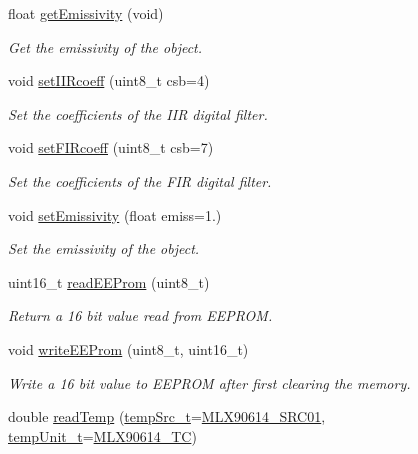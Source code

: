 \begin{DoxyCompactItemize}
float \mbox{\hyperlink{class_m_l_x90614_a44234371f1e9dd36781898d0c87fdbbf}{get\+Emissivity}} (void)
\begin{DoxyCompactList}\small\item\em Get the emissivity of the object. \end{DoxyCompactList}\item 
void \mbox{\hyperlink{class_m_l_x90614_af62b9d897164375e8c17fb5a8d367600}{set\+I\+I\+Rcoeff}} (uint8\+\_\+t csb=4)
\begin{DoxyCompactList}\small\item\em Set the coefficients of the I\+IR digital filter. \end{DoxyCompactList}\item 
void \mbox{\hyperlink{class_m_l_x90614_a3849320b7988ca5882f25fbc87dd0de7}{set\+F\+I\+Rcoeff}} (uint8\+\_\+t csb=7)
\begin{DoxyCompactList}\small\item\em Set the coefficients of the F\+IR digital filter. \end{DoxyCompactList}\item 
void \mbox{\hyperlink{class_m_l_x90614_ab7e462d10f8d26bdd55f77eb4c81a5ff}{set\+Emissivity}} (float emiss=1.)
\begin{DoxyCompactList}\small\item\em Set the emissivity of the object. \end{DoxyCompactList}\item 
uint16\+\_\+t \mbox{\hyperlink{class_m_l_x90614_aab0a010875527f4ac3d2794017624b10}{read\+E\+E\+Prom}} (uint8\+\_\+t)
\begin{DoxyCompactList}\small\item\em Return a 16 bit value read from E\+E\+P\+R\+OM. \end{DoxyCompactList}\item 
void \mbox{\hyperlink{class_m_l_x90614_a70b3e428c623b6af5bedf199f5c16490}{write\+E\+E\+Prom}} (uint8\+\_\+t, uint16\+\_\+t)
\begin{DoxyCompactList}\small\item\em Write a 16 bit value to E\+E\+P\+R\+OM after first clearing the memory. \end{DoxyCompactList}\item 
double \mbox{\hyperlink{class_m_l_x90614_ab2a8bafff744a249325105d238bfe248}{read\+Temp}} (\mbox{\hyperlink{class_m_l_x90614_a500f8c49b00e725d5c201092d9c02b8b}{temp\+Src\+\_\+t}}=\mbox{\hyperlink{class_m_l_x90614_a500f8c49b00e725d5c201092d9c02b8ba91f620721ea47dec379db791d735a55b}{M\+L\+X90614\+\_\+\+S\+R\+C01}}, \mbox{\hyperlink{class_m_l_x90614_a18769519e647d93c959566b81d2e514f}{temp\+Unit\+\_\+t}}=\mbox{\hyperlink{class_m_l_x90614_a18769519e647d93c959566b81d2e514fa75d66a29cab65ff4514b5cd6a268c7bf}{M\+L\+X90614\+\_\+\+TC}})

\end{DoxyCompactItemize}
